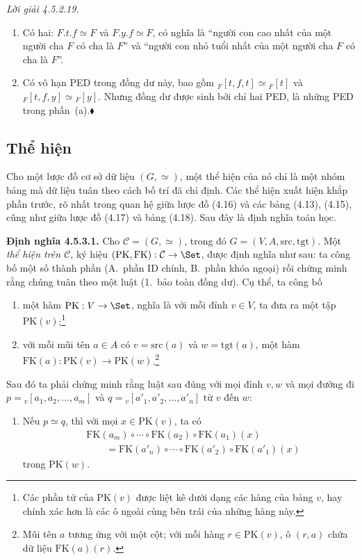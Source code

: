 \noindent\textit{Lời giải 4.5.2.19.}\keepwithnext
\begin{enumerate}[label=\alph*.]
\item Có hai: $F.t.f\simeq F$ và $F.y.f\simeq F$, có nghĩa là ``người con cao nhất của một người cha $F$ có cha là $F$'' và ``người con nhỏ tuổi nhất của một người cha $F$ có cha là $F$''.
\item Có vô hạn PED trong đồng dư này, bao gồm ${}_F[t,f,t]\simeq{}_F[t]$ và ${}_F[t,f,y]\simeq{}_F[y]$. Nhưng đồng dư được sinh bởi chỉ hai PED, là những PED trong phần~(a).\nobreak\hfill$\blacklozenge$
\end{enumerate}

\subsection{Thể hiện}

Cho một lược đồ cơ sở dữ liệu $(G,\simeq)$, một thể hiện của nó chỉ là một nhóm bảng mà dữ liệu tuân theo cách bố trí đã chỉ định. Các thể hiện xuất hiện khắp phần trước, rõ nhất trong quan hệ giữa lược đồ (4.16) và các bảng (4.13), (4.15), cũng như giữa lược đồ (4.17) và bảng (4.18). Sau đây là định nghĩa toán học.

\noindent\textbf{Định nghĩa 4.5.3.1.}\keepwithnext
Cho $\mathcal C=(G,\simeq)$, trong đó $G=(V,A,\mathrm{src},\mathrm{tgt})$. Một \emph{thể hiện trên $\mathcal C$}, ký hiệu $(\mathrm{PK},\mathrm{FK}):\mathcal C\to\Set$, được định nghĩa như sau: ta công bố một số thành phần (A.~phần ID chính, B.~phần khóa ngoại) rồi chứng minh rằng chúng tuân theo một luật (1.~bảo toàn đồng dư). Cụ thể, ta công bố
\begin{enumerate}[label=\Alph*.]
\item một hàm $\mathrm{PK}:V\to\Set$, nghĩa là với mỗi đỉnh $v\in V$, ta đưa ra một tập $\mathrm{PK}(v)$;\footnote{Các phần tử của $\mathrm{PK}(v)$ được liệt kê dưới dạng các hàng của bảng $v$, hay chính xác hơn là các ô ngoài cùng bên trái của những hàng này.}
\item với mỗi mũi tên $a\in A$ có $v=\mathrm{src}(a)$ và $w=\mathrm{tgt}(a)$, một hàm $\mathrm{FK}(a):\mathrm{PK}(v)\to\mathrm{PK}(w)$.\footnote{Mũi tên $a$ tương ứng với một cột; với mỗi hàng $r\in\mathrm{PK}(v)$, ô $(r,a)$ chứa dữ liệu $\mathrm{FK}(a)(r)$.}
\end{enumerate}
Sau đó ta phải chứng minh rằng luật sau đúng với mọi đỉnh $v,w$ và mọi đường đi $p={}_v[a_1,a_2,\ldots,a_m]$ và $q={}_v[a'_1,a'_2,\ldots,a'_n]$ từ $v$ đến $w$:
\begin{enumerate}
\item Nếu $p\simeq q$, thì với mọi $x\in\mathrm{PK}(v)$, ta có
\[
\begin{aligned}
&\mathrm{FK}(a_m)\circ\cdots\circ\mathrm{FK}(a_2)\circ\mathrm{FK}(a_1)(x)\\
&\qquad=\mathrm{FK}(a'_n)\circ\cdots\circ\mathrm{FK}(a'_2)\circ\mathrm{FK}(a'_1)(x)
\end{aligned}
\]
trong $\mathrm{PK}(w)$.
\end{enumerate}

